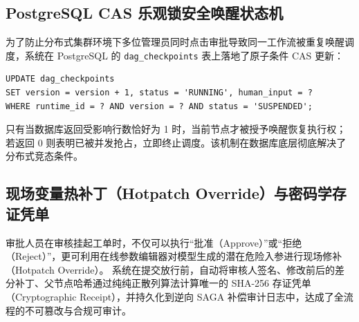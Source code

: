\subsection{PostgreSQL CAS 乐观锁安全唤醒状态机}
为了防止分布式集群环境下多位管理员同时点击审批导致同一工作流被重复唤醒调度，系统在 PostgreSQL 的 \texttt{dag\_checkpoints} 表上落地了原子条件 CAS 更新：
\begin{verbatim}
UPDATE dag_checkpoints
SET version = version + 1, status = 'RUNNING', human_input = ?
WHERE runtime_id = ? AND version = ? AND status = 'SUSPENDED';
\end{verbatim}
只有当数据库返回受影响行数恰好为 1 时，当前节点才被授予唤醒恢复执行权；若返回 0 则表明已被并发抢占，立即终止调度。该机制在数据库底层彻底解决了分布式竞态条件。

\subsection{现场变量热补丁（Hotpatch Override）与密码学存证凭单}
审批人员在审核挂起工单时，不仅可以执行“批准（Approve）”或“拒绝（Reject）”，更可利用在线参数编辑器对模型生成的潜在危险入参进行现场修补（Hotpatch Override）。
系统在提交放行前，自动将审核人签名、修改前后的差分补丁、父节点哈希通过纯纯正散列算法计算唯一的 SHA-256 存证凭单（Cryptographic Receipt），并持久化到逆向 SAGA 补偿审计日志中，达成了全流程的不可篡改与合规可审计。
